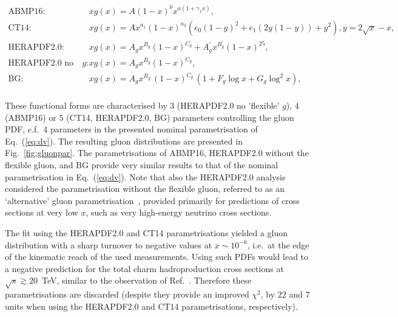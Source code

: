 \documentclass[12pt]{article}
\begin{document}
\begin{equation}
\begin{aligned}
\textrm{ABMP16:}~~~~~~ &xg(x)=A (1 - x)^b x^{a (1 + \gamma_{1} x)},\\
\textrm{CT14:}~~~~~~ &xg(x) = Ax^{a_1}(1-x)^{a_2}(e_0(1-y)^2+e_1(2y(1-y))+y^2), y=2\sqrt{x}-x,\\
\textrm{HERAPDF2.0:}~~~~~~ &xg(x)=A_gx^{B_g}(1-x)^{C_g}+A^{\prime}_gx^{B^{\prime}_g}(1-x)^{25},\\
\textrm{HERAPDF2.0 no flex. $g$:}~~~~~~ &xg(x)=A_gx^{B_g}(1-x)^{C_g},\\
\textrm{BG:}~~~~~~ &xg(x)=A_{g} x^{B_{g}}\,(1-x)^{C_{g}}\, (1 + F_{g} {\log x} + G_{g} {\log^2 x}),\\
\end{aligned}
\label{eq:gluonpar}
\end{equation}

These functional forms are characterised by $3$ (HERAPDF2.0 no 'flexible' $g$), $4$ (ABMP16) or $5$ (CT14, HERAPDF2.0, BG) parameters controlling the gluon PDF, c.f.\ $4$ parameters in the presented nominal parametrisation of Eq.~(\ref{eq:dv}). 
The resulting gluon distributions are presented in Fig.~\ref{fig:gluonpar}. The parametrisations of ABMP16, HERAPDF2.0 without the flexible gluon, and BG provide very similar results to that of the nominal parametrisation in Eq.~(\ref{eq:dv}). 
Note that also the HERAPDF2.0 analysis considered the parametrisation without the flexible gluon, referred to as an `alternative' gluon parametrisation~\cite{Abramowicz:2015mha}, provided primarily for predictions of cross sections at very low $x$, such as very high-energy neutrino cross sections.

The fit using the HERAPDF2.0 and CT14 parametrisations yielded a gluon distribution with a sharp turnover to negative values at $x \sim 10^{-6}$, i.e.\ at the edge of the kinematic reach of the used measurements. Using such PDFs would lead to a negative prediction for the total charm hadroproduction cross sections at $\sqrt{s} \gtrsim 20$~TeV, similar to the observation of Ref.~\cite{Accardi:2016ndt}. Therefore these parametrisations are discarded (despite they provide an improved $\chi^2$, by $22$ and $7$ units when using the HERAPDF2.0 and CT14 parametrisations, respectively).
\end{document}
